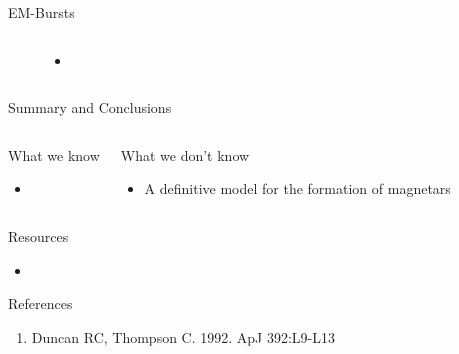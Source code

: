 \documentclass[hyperref=pdftex, presentation]{beamer}
\begin{document}
\begin{frame}{\Large EM-Bursts}
	\begin{figure}
		\begin{columns}[c] %
			
			\begin{itemize}
				\item<2->
			\end{itemize}
			
		\end{columns}
	\end{figure}
\end{frame}






\begin{frame}{Summary and Conclusions}

  \begin{columns}[c] %

			\begin{block}{What we know}
				\begin{itemize}
 					\item<2-> 
				\end{itemize}
			\end{block}
			\begin{block}{What we don't know}
				\begin{itemize}
 					\item<3-> A definitive model for the formation of magnetars %
				\end{itemize}
			\end{block}

		\end{columns}
\end{frame}


\begin{frame}{Resources}
	\begin{itemize}
		\item 
	\end{itemize}
\end{frame}

\begin{frame}{References}
	\begin{enumerate}
		\item Duncan RC, Thompson C. 1992. ApJ 392:L9-L13
	\end{enumerate}
\end{frame}
\end{document}
